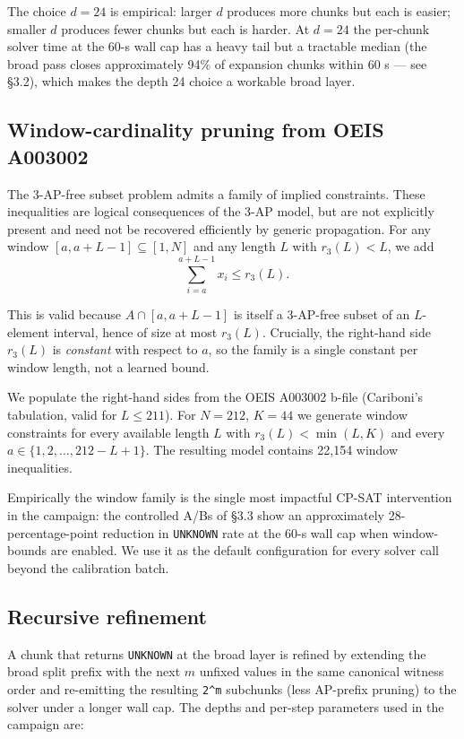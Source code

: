 The choice $d = 24$ is empirical: larger $d$ produces more chunks but
each is easier; smaller $d$ produces fewer chunks but each is harder.
At $d = 24$ the per-chunk solver time at the 60-s wall cap has a
heavy tail but a tractable median (the broad pass closes approximately
94\% of expansion chunks within 60 s --- see §3.2), which makes the depth
24 choice a workable broad layer.

\subsection{Window-cardinality pruning from OEIS A003002}\label{window-cardinality-pruning-from-oeis-a003002}

The 3-AP-free subset problem admits a family of implied constraints.
These inequalities are logical consequences of the 3-AP model, but are
not explicitly present and need not be recovered efficiently by generic
propagation. For any window $[a,a+L-1]\subseteq[1,N]$ and any length $L$
with $r_3(L)<L$, we add
\[
  \sum_{i=a}^{a+L-1}x_i \leq r_3(L).
\]

This is valid because $A\cap[a,a+L-1]$ is itself a
3-AP-free subset of an $L$-element interval, hence of size at most
$r_3(L)$. Crucially, the right-hand side $r_3(L)$ is \emph{constant} with
respect to $a$, so the family is a single constant per window length,
not a learned bound.

We populate the right-hand sides from the OEIS A003002 b-file
(Cariboni's tabulation, valid for $L \leq 211$). For $N = 212$, $K = 44$
we generate window constraints for every available length $L$ with
$r_3(L)<\min(L,K)$ and every $a\in\{1,2,\ldots,212-L+1\}$. The
resulting model contains 22,154 window inequalities.

Empirically the window family is the single most impactful CP-SAT
intervention in the campaign: the controlled A/Bs of §3.3 show an
approximately 28-percentage-point reduction in \texttt{UNKNOWN} rate at the 60-s wall
cap when window-bounds are enabled. We use it as the default
configuration for every solver call beyond the calibration batch.

\subsection{Recursive refinement}\label{recursive-refinement}

A chunk that returns \texttt{UNKNOWN} at the broad layer is refined by
extending the broad split prefix with the next $m$ unfixed values in the
same canonical witness order and re-emitting the resulting \texttt{2\^{}m}
subchunks (less AP-prefix pruning) to the solver under a longer
wall cap. The depths and per-step parameters used in the campaign
are:

